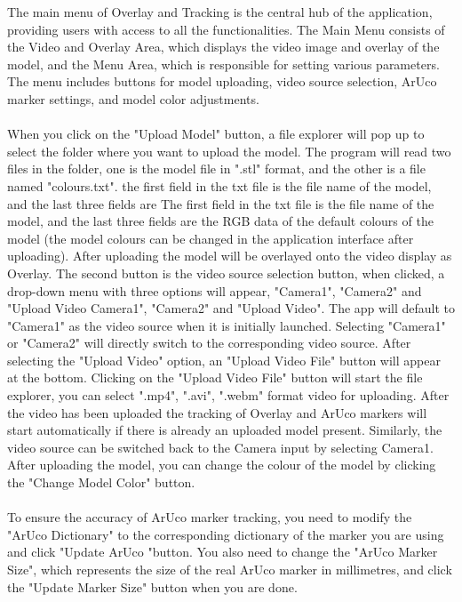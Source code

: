 \documentclass[12pt]{article}
\begin{document}
\begin{enumerate}
\begin{enumerate}
                     
                        The main menu of Overlay and Tracking is the central hub of the application, providing users with access to all the functionalities.
                        The Main Menu consists of the Video and Overlay Area, which displays the video image and overlay of the model, and the Menu Area, which is responsible for setting various parameters.
                        The menu includes buttons for model uploading, video source selection, ArUco marker settings, and model color adjustments.
                        \\\\
                        When you click on the "Upload Model" button, a file explorer will pop up to select the folder where you want to upload the model. The program will read two files in the folder, one is the model file in ".stl" format, and the other is a file named "colours.txt". the first field in the txt file is the file name of the model, and the last three fields are The first field in the txt file is the file name of the model, and the last three fields are the RGB data of the default colours of the model (the model colours can be changed in the application interface after uploading). After uploading the model will be overlayed onto the video display as Overlay. The second button is the video source selection button, when clicked, a drop-down menu with three options will appear, "Camera1", "Camera2" and "Upload Video Camera1", "Camera2" and "Upload Video". The app will default to "Camera1" as the video source when it is initially launched. Selecting "Camera1" or "Camera2" will directly switch to the corresponding video source. After selecting the "Upload Video" option, an "Upload Video File" button will appear at the bottom. Clicking on the "Upload Video File" button will start the file explorer, you can select ".mp4", ".avi", ".webm" format video for uploading. After the video has been uploaded the tracking of Overlay and ArUco markers will start automatically if there is already an uploaded model present. Similarly, the video source can be switched back to the Camera input by selecting Camera1. After uploading the model, you can change the colour of the model by clicking the "Change Model Color" button.
                        \label{sec:upload}
                        \\\\
                        To ensure the accuracy of ArUco marker tracking, you need to modify the "ArUco Dictionary" to the corresponding dictionary of the marker you are using and click "Update ArUco "button. You also need to change the "ArUco Marker Size", which represents the size of the real ArUco marker in millimetres, and click the "Update Marker Size" button when you are done.


\end{enumerate}
\end{enumerate}
\end{document}
